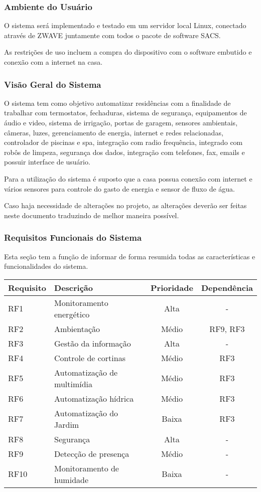 \subsubsection{Ambiente do Usuário}

	O sistema será implementado e testado em um servidor local Linux, conectado através de ZWAVE juntamente com todos o
	pacote de software SACS.

	As restrições de uso incluem a compra do dispositivo com o software embutido e conexão com a internet na casa.

\subsubsection{Visão Geral do Sistema}


	O sistema tem como objetivo automatizar residências com a finalidade de trabalhar com termostatos, fechaduras,
	sistema de segurança, equipamentos de áudio e video, sistema de irrigação, portas de garagem, sensores ambientais,
	 câmeras, luzes, gerenciamento de energia, internet e redes relacionadas, controlador de piscinas e spa, integração
	  com radio frequência, integrado com robôs de limpeza, segurança dos dados, integração com telefones, fax, emails
	    e possuir interface de usuário.


	Para a utilização do sistema é suposto que a casa possua conexão com internet e vários sensores para controle do
	gasto de energia e sensor de fluxo de água.

	Caso haja necessidade de alterações no projeto, as alterações deverão ser feitas neste documento traduzindo de
	melhor maneira possível.

\subsubsection{Requisitos Funcionais do Sistema}

	Esta seção tem a função de informar de forma resumida todas as características e funcionalidades do sistema.

\begin{tabular}{|l|l|c|c|}
	\hline
	\textbf{Requisito} & \textbf{Descrição} & \textbf{Prioridade} & \textbf{Dependência}\tabularnewline
	\hline
	\hline
	RF1 & Monitoramento energético & Alta & -\tabularnewline
	\hline
	RF2 & Ambientação & Médio & RF9, RF3\tabularnewline
	\hline
	RF3 & Gestão da informação & Alta & -\tabularnewline
	\hline
	RF4 & Controle de cortinas & Médio & RF3\tabularnewline
	\hline
	RF5 & Automatização de multimídia & Médio & RF3\tabularnewline
	\hline
	RF6 & Automatização hídrica & Médio & RF3\tabularnewline
	\hline
	RF7 & Automatização do Jardim & Baixa & RF3\tabularnewline
	\hline
	RF8 & Segurança & Alta & -\tabularnewline
	\hline
	RF9 & Detecção de presença & Médio & -\tabularnewline
	\hline
	RF10 & Monitoramento de humidade & Baixa & -\tabularnewline
	\hline
\end{tabular}

